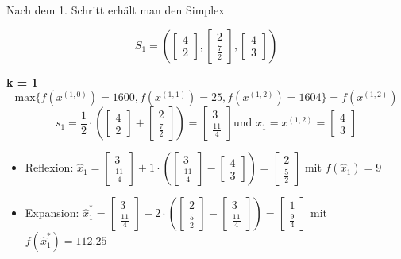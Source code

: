 \documentclass[a4paper, 12pt]{report}
\begin{document}
Nach dem 1. Schritt erhält man den Simplex

$$S_1 = \left(\begin{bmatrix}4\\2\end{bmatrix}, \begin{bmatrix}2\\\frac{7}{2}\end{bmatrix}, \begin{bmatrix}4\\3\end{bmatrix}\right)$$

\textbf{k = 1}\\
$$\text{max}\{f(x^{(1,0)}) = 1600, f(x^{(1,1)}) = 25, f(x^{(1,2)}) = 1604\} = f(x^{(1,2)})$$
$$s_1 = \frac{1}{2}\cdot \left(\begin{bmatrix}4\\2\end{bmatrix} + \begin{bmatrix}2\\\frac{7}{2}\end{bmatrix}\right) = \begin{bmatrix}3\\\frac{11}{4}\end{bmatrix} \text{und } x_1 = x^{(1,2)} = \begin{bmatrix}4\\3\end{bmatrix}$$
\begin{itemize}
\item Reflexion: $\hat x_1 = \begin{bmatrix}3\\\frac{11}{4}\end{bmatrix} + 1\cdot\left(\begin{bmatrix}3\\\frac{11}{4}\end{bmatrix} - \begin{bmatrix}4\\3\end{bmatrix}\right) = \begin{bmatrix}2\\\frac{5}{2}\end{bmatrix}$ mit $f(\hat x_1) = 9$
\item Expansion: $\hat x_1^* = \begin{bmatrix}3\\\frac{11}{4}\end{bmatrix} + 2\cdot\left(\begin{bmatrix}2\\\frac{5}{2}\end{bmatrix} - \begin{bmatrix}3\\\frac{11}{4}\end{bmatrix}\right) = \begin{bmatrix}1\\\frac{9}{4}\end{bmatrix}$ mit $f(\hat x_1^*) = 112.25$
\end{itemize}
\end{document}
